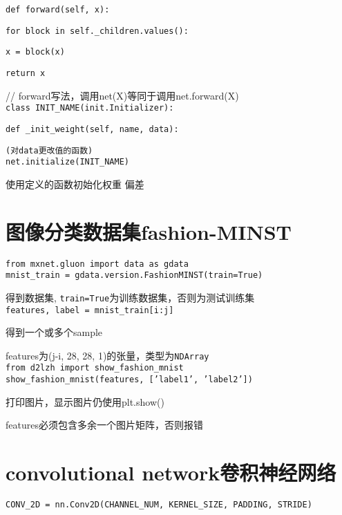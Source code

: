 \documentclass[UTF8]{ctexart}
\begin{document}
  \texttt{def forward(self, x):}

  \quad \texttt{for block in self.\_children.values():}

  \quad \quad \texttt{x = block(x)}

  \quad \quad \texttt{return x}

  // forward写法，调用net(X)等同于调用net.forward(X)\\
\texttt{class INIT\_NAME(init.Initializer):}

  \texttt{def \_init\_weight(self, name, data):}

  \quad \texttt{(对data更改值的函数)}\\
\texttt{net.initialize(INIT\_NAME)}

  使用定义的函数初始化权重 偏差

\section{图像分类数据集fashion-MINST}
\noindent \texttt{from mxnet.gluon import data as gdata}\\
\texttt{mnist\_train = gdata.version.FashionMINST(train=True)} 

  得到数据集, \texttt{train=True}为训练数据集，否则为测试训练集\\
\texttt{features, label = mnist\_train[i:j]}
  
  得到一个或多个sample
  
  features为(j-i, 28, 28, 1)的张量，类型为\texttt{NDArray}\\
\texttt{from d2lzh import show\_fashion\_mnist}\\
\texttt{show\_fashion\_mnist(features, ['label1', 'label2'])}

  打印图片，显示图片仍使用plt.show()

  features必须包含多余一个图片矩阵，否则报错

\section{convolutional network卷积神经网络}
\noindent \texttt{CONV\_2D = nn.Conv2D(CHANNEL\_NUM, KERNEL\_SIZE, PADDING, STRIDE)}
\end{document}
